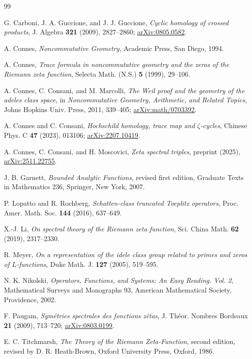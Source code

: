 \documentclass[11pt]{article}
\theoremstyle{definition}
\theoremstyle{remark}
\begin{document}
\begin{thebibliography}{99}

G. Carboni, J. A. Guccione, and J. J. Guccione,
\emph{Cyclic homology of crossed products},
J. Algebra \textbf{321} (2009), 2827--2860;
\href{https://arxiv.org/abs/0805.0582}{arXiv:0805.0582}.

A. Connes,
\emph{Noncommutative Geometry},
Academic Press, San Diego, 1994.

A. Connes,
\emph{Trace formula in noncommutative geometry and the zeros of the Riemann
zeta function},
Selecta Math. (N.S.) \textbf{5} (1999), 29--106.

A. Connes, C. Consani, and M. Marcolli,
\emph{The Weil proof and the geometry of the adeles class space},
in \emph{Noncommutative Geometry, Arithmetic, and Related Topics},
Johns Hopkins Univ. Press, 2011, 339--405;
\href{https://arxiv.org/abs/math/0703392}{arXiv:math/0703392}.

A. Connes and C. Consani,
\emph{Hochschild homology, trace map and $\zeta$-cycles},
Chinese Phys. C \textbf{47} (2023), 013106;
\href{https://arxiv.org/abs/2207.10419}{arXiv:2207.10419}.

A. Connes, C. Consani, and H. Moscovici,
\emph{Zeta spectral triples}, preprint (2025),
\href{https://arxiv.org/abs/2511.22755}{arXiv:2511.22755}.

J. B. Garnett,
\emph{Bounded Analytic Functions}, revised first edition,
Graduate Texts in Mathematics 236, Springer, New York, 2007.

P. Lopatto and R. Rochberg,
\emph{Schatten-class truncated Toeplitz operators},
Proc. Amer. Math. Soc. \textbf{144} (2016), 637--649.

X.-J. Li,
\emph{On spectral theory of the Riemann zeta function},
Sci. China Math. \textbf{62} (2019), 2317--2330.

R. Meyer,
\emph{On a representation of the idele class group related to primes and zeros
of $L$-functions},
Duke Math. J. \textbf{127} (2005), 519--595.

N. K. Nikolski,
\emph{Operators, Functions, and Systems: An Easy Reading. Vol. 2},
Mathematical Surveys and Monographs 93, American Mathematical Society,
Providence, 2002.

F. Paugam,
\emph{Sym\'etries spectrales des fonctions z\^etas},
J. Th\'eor. Nombres Bordeaux \textbf{21} (2009), 713--720;
\href{https://arxiv.org/abs/0803.0199}{arXiv:0803.0199}.

E. C. Titchmarsh,
\emph{The Theory of the Riemann Zeta-Function}, second edition, revised by
D. R. Heath-Brown, Oxford University Press, Oxford, 1986.

\end{thebibliography}
\end{document}
